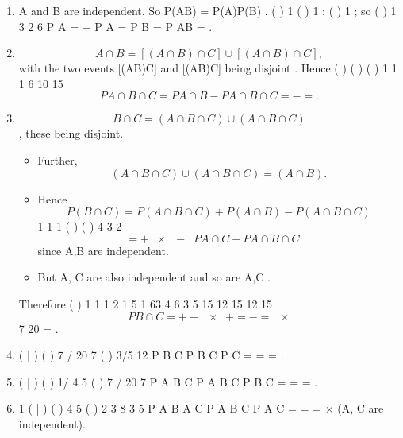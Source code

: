 \documentclass[a4paper,12pt]{article}
\begin{document}
\begin{enumerate}
\item A and B are independent. So P(A\cap B) = P(A)P(B) .
( ) 1 ( ) 1 ; ( ) 1 ; so ( ) 1
3 2 6
P A = − P A = P B = P A\cap B = .
\item  \[A\cap B = [(A\cap B)\cap C]\cup[(A\cap B)\cap C],\]
with the two events [(A\cap B)\cap C] and [(A\cap B)\cap C] being disjoint .
Hence ( ) ( ) ( ) 1 1 1
6 10 15
\[P A\cap B \cap C = P A\cap B − P A\cap B \cap C = − = .\]
\item  \[B\cap C = (A\cap B\cap C)\cup(A\cap B\cap C) \], these being disjoint.
\begin{itemize}
    \item Further, \[(A\cap B \cap C)\cup(A\cap B \cap C) = (A\cap B) .\]
\item Hence \[P(B \cap C) = P(A\cap B \cap C) + P(A\cap B) − P(A\cap B \cap C)\]
1 1 1 ( ) ( )
4 3 2
\[= +  ×  − P A\cap C − P A\cap B \cap C   \]
since A,B are independent.
\item But A, C are also independent and so are A,C .
\end{itemize}

Therefore ( ) 1 1 1 2 1 5 1 63
4 6 3 5 15 12 15 12 15
\[P B\cap C = + −  ×  + = − =   ×\]
7
20
= .
\item ( | ) ( ) 7 / 20 7
( ) 3/5 12
P B C P B C
P C
= \cap = = .
\item  ( | ) ( ) 1/ 4 5
( ) 7 / 20 7
P A B C P A B C
P B C
\cap = \cap \cap = =
\cap
.
\item 
1
( | ) ( ) 4 5 ( ) 2 3 8
3 5
P A B A C P A B C
P A C
\cap \cap = \cap \cap = =
\cap ×
(A, C are independent).
\end{enumerate}
\end{document}
